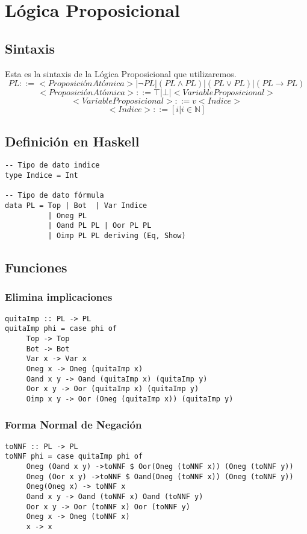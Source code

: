 \documentclass[11pt]{article}
\begin{document}
\section{Lógica Proposicional}
\label{sec-2}
\subsection{Sintaxis}
\label{sec-2-1}
Esta es la sintaxis de la Lógica Proposicional que utilizaremos. 
\[PL ::= <ProposiciónAtómica> | \neg PL | (PL \land PL) | (PL \lor PL) | (PL \to PL) \]
\[<ProposiciónAtómica> ::= \top | \bot | <VariableProposicional>\]
\[<VariableProposicional> ::= v<Indice>\]
\[ <Indice> ::= [i | i \in \mathbb{N}]\]

\subsection{Definición en Haskell}
\label{sec-2-2}
\begin{verbatim}
-- Tipo de dato indice
type Indice = Int

-- Tipo de dato fórmula
data PL = Top | Bot  | Var Indice
	      | Oneg PL 
	      | Oand PL PL | Oor PL PL 
	      | Oimp PL PL deriving (Eq, Show)
\end{verbatim}

\subsection{Funciones}
\label{sec-2-3}
\subsubsection{Elimina implicaciones}
\label{sec-2-3-1}
\begin{verbatim}
quitaImp :: PL -> PL
quitaImp phi = case phi of
     Top -> Top
     Bot -> Bot
     Var x -> Var x
     Oneg x -> Oneg (quitaImp x)
     Oand x y -> Oand (quitaImp x) (quitaImp y)
     Oor x y -> Oor (quitaImp x) (quitaImp y)
     Oimp x y -> Oor (Oneg (quitaImp x)) (quitaImp y)
\end{verbatim}
\subsubsection{Forma Normal de Negación}
\label{sec-2-3-2}
\begin{verbatim}
toNNF :: PL -> PL
toNNF phi = case quitaImp phi of
     Oneg (Oand x y) ->toNNF $ Oor(Oneg (toNNF x)) (Oneg (toNNF y))
     Oneg (Oor x y) ->toNNF $ Oand(Oneg (toNNF x)) (Oneg (toNNF y))
     Oneg(Oneg x) -> toNNF x
     Oand x y -> Oand (toNNF x) Oand (toNNF y)
     Oor x y -> Oor (toNNF x) Oor (toNNF y)
     Oneg x -> Oneg (toNNF x)
     x -> x
\end{verbatim}
\end{document}
